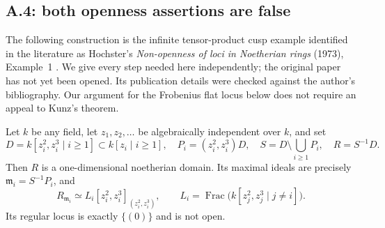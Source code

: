 \subsection{A.4: both openness assertions are false}

The following construction is the infinite tensor-product cusp example
identified in the literature as Hochster's
\emph{Non-openness of loci in Noetherian rings} (1973), Example~1
\cite{rootHochster1973}.
We give every step needed here independently; the original paper has not
yet been opened.  Its publication details were checked against the
author's bibliography.  Our argument for the Frobenius flat locus below
does not require an appeal to Kunz's theorem.

\begin{lemma}\label{SA23-A-10}
Let $k$ be any field, let $z_1,z_2,\ldots$ be algebraically independent
over $k$, and set
\[
 D=k[z_i^2,z_i^3\mid i\geq1]\subset k[z_i\mid i\geq1],\quad
 P_i=(z_i^2,z_i^3)D,\quad
 S=D\setminus\bigcup_{i\geq1}P_i,\quad R=S^{-1}D.
\]
Then $R$ is a one-dimensional noetherian domain.  Its maximal ideals
are precisely $\mathfrak m_i=S^{-1}P_i$, and
\[
 R_{\mathfrak m_i}\simeq
 L_i[z_i^2,z_i^3]_{(z_i^2,z_i^3)},\qquad
 L_i=\operatorname{Frac}\bigl(k[z_j^2,z_j^3\mid j\ne i]\bigr).
\]
Its regular locus is exactly $\{(0)\}$ and is not open.
\end{lemma}
